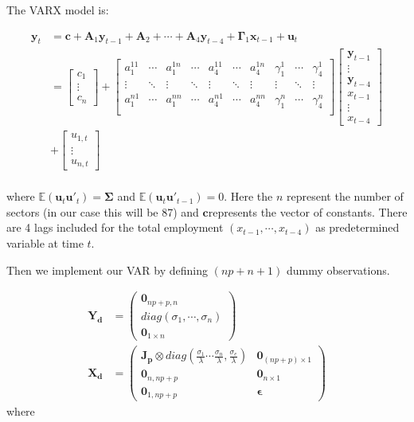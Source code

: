 \documentclass{monashthesis}
\begin{document}
The VARX model is:

\begin{align}
\boldsymbol{y}_t&=\boldsymbol{c}+\boldsymbol{A}_1 \boldsymbol{y}_{t-1}+\boldsymbol{A}_2+\cdots+\boldsymbol{A}_4\boldsymbol{y}_{t-4}+\boldsymbol{\Gamma}_1\boldsymbol{x}_{t-1}+\boldsymbol{u}_t\\
&=
\begin{bmatrix}
c_1\\
\vdots\\
c_n
\end{bmatrix}
+
\begin{bmatrix}
a_1^{11}&\cdots&a_1^{1n}&\cdots&a_4^{11}&\cdots&a_4^{1n}&\gamma_1^{1}&\cdots&\gamma_4^{1}\\
\vdots&\ddots&\vdots&\ddots&\vdots&\ddots&\vdots&\vdots&\ddots&\vdots\\
a_1^{n1}&\cdots&a_1^{nn}&\cdots&a_4^{n1}&\cdots&a_4^{nn}&\gamma_1^n&\cdots&\gamma_4^n\\
\end{bmatrix}
\begin{bmatrix}
\boldsymbol{y}_{t-1}\\
\vdots\\
\boldsymbol{y}_{t-4}\\
x_{t-1}\\
\vdots\\
x_{t-4}
\end{bmatrix}\\
&+
\begin{bmatrix}
u_{1,t}\\
\vdots\\
u_{n,t}
\end{bmatrix}\\
\end{align}

where \(\mathbb{E}(\boldsymbol{u}_t\boldsymbol{u}'_t)=\boldsymbol{\Sigma}\) and \(\mathbb{E}(\boldsymbol{u}_t\boldsymbol{u'}_{t-1})=0\). Here the \(n\) represent the number of sectors (in our case this will be 87) and \(\boldsymbol{c}\)represents the vector of constants. There are 4 lags included for the total employment \((x_{t-1},\cdots,x_{t-4})\) as predetermined variable at time \(t\).

Then we implement our VAR by defining \((np+n+1)\) dummy observations.

\[
\begin{aligned}
\boldsymbol{Y_d}&=
\begin{pmatrix}
\boldsymbol0_{np+p,n}\\
diag({\sigma_1,\cdots,\sigma_n})\\
\boldsymbol0_{1\times n}
\end{pmatrix}\\
\boldsymbol{X_d}&=
\begin{pmatrix}
\boldsymbol{J_p}\otimes diag(\frac{\sigma_1}{\lambda}\cdots\frac{\sigma_n}{\lambda},\frac{\sigma_e}{\lambda})&\boldsymbol0_{(np+p)\times1}\\
\boldsymbol 0_{n,np+p}&\boldsymbol 0_{n\times1}
\\
\boldsymbol 0_{1,np+p}&\boldsymbol{\epsilon}
\end{pmatrix}
\end{aligned}
\] where
\end{document}
